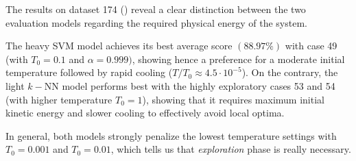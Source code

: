 \documentclass[12pt, openany]{article}
\begin{document}
The results on dataset 174 () reveal a clear distinction between the two evaluation models regarding the required physical energy of the system.

The heavy SVM model achieves its best average score $(88.97\%)$ with case 49 (with $T_0=0.1$ and $\alpha=0.999)$, showing hence a preference for a moderate initial temperature followed by rapid cooling ($T/T_0 \approx 4.5\cdot10^{-5}$). On the contrary, the light $k-$NN model performs best with the highly exploratory cases 53 and 54 (with higher temperature $T_0=1$), showing that it requires maximum initial kinetic energy and slower cooling to effectively avoid local optima.

In general, both models strongly penalize the lowest temperature settings with $T_0=0.001$ and $T_0=0.01$, which tells us that \emph{exploration} phase is really necessary.
\end{document}
